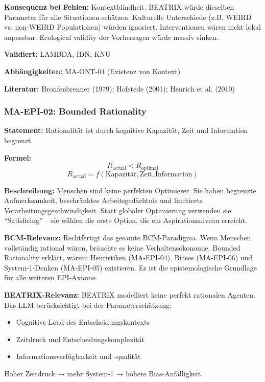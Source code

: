 \textbf{Konsequenz bei Fehlen:}
Kontextblindheit. BEATRIX würde dieselben Parameter für alle Situationen schätzen. Kulturelle Unterschiede (z.B. WEIRD vs. non-WEIRD Populationen) würden ignoriert. Interventionen wären nicht lokal anpassbar. Ecological validity der Vorhersagen würde massiv sinken.

\textbf{Validiert:} LAMBDA, IDN, KNU

\textbf{Abhängigkeiten:} MA-ONT-04 (Existenz von Kontext)

\textbf{Literatur:} Bronfenbrenner (1979); Hofstede (2001); Henrich et al. (2010)


\subsubsection*{MA-EPI-02: Bounded Rationality}

\textbf{Statement:} Rationalität ist durch kognitive Kapazität, Zeit und Information begrenzt.

\textbf{Formel:}
\begin{equation}
R_{\text{actual}} < R_{\text{optimal}}
\end{equation}
\begin{equation}
R_{\text{actual}} = f(\text{Kapazität}, \text{Zeit}, \text{Information})
\end{equation}

\textbf{Beschreibung:}
Menschen sind keine perfekten Optimierer. Sie haben begrenzte Aufmerksamkeit, beschränktes Arbeitsgedächtnis und limitierte Verarbeitungsgeschwindigkeit. Statt globaler Optimierung verwenden sie ``Satisficing'' -- sie wählen die erste Option, die ein Aspirationsniveau erreicht.

\textbf{BCM-Relevanz:}
Rechtfertigt das gesamte BCM-Paradigma. Wenn Menschen vollständig rational wären, bräuchte es keine Verhaltensökonomie. Bounded Rationality erklärt, warum Heuristiken (MA-EPI-04), Biases (MA-EPI-06) und System-1-Denken (MA-EPI-05) existieren. Es ist die epistemologische Grundlage für alle weiteren EPI-Axiome.

\textbf{BEATRIX-Relevanz:}
BEATRIX modelliert keine perfekt rationalen Agenten. Das LLM berücksichtigt bei der Parameterschätzung:
\begin{itemize}
    \item Cognitive Load des Entscheidungskontexts
    \item Zeitdruck und Entscheidungskomplexität
    \item Informationsverfügbarkeit und -qualität
\end{itemize}
Hoher Zeitdruck → mehr System-1 → höhere Bias-Anfälligkeit.

